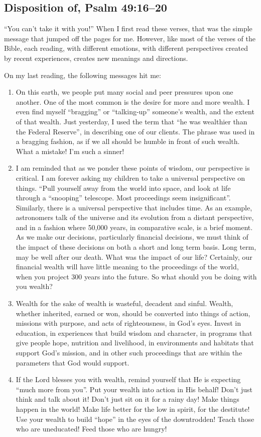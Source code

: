 \documentclass[12pt]{memoir}
\begin{document}
\subsection{Disposition of, Psalm 49:16--20}

``You can't take it with you!'' When I first read these verses,
that was the simple message that jumped off the pages for me. However,
like most of the verses of the Bible, each reading, with different
emotions, with different perspectives created by recent experiences,
creates new meanings and directions.

On my last reading, the following messages hit me: 
\begin{enumerate}
\item On this earth, we people put many social and peer pressures upon one
another. One of the most common is the desire for more and more wealth.
I even find myself ``bragging'' or ``talking-up'' someone's wealth,
and the extent of that wealth. Just yesterday, I used the term that
``he was wealthier than the Federal Reserve'', in describing one
of our clients. The phrase was used in a bragging fashion, as if we
all should be humble in front of such wealth. What a mistake! I'm
such a sinner! 
\item I am reminded that as we ponder these points of wisdom, our perspective
is critical. I am forever asking my children to take a universal perspective
on things. ``Pull yourself away from the world into space, and look
at life through a ``snooping'' telescope. Most proceedings seem
insignificant''. Similarly, there is a universal perspective that
includes time. As an example, astronomers talk of the universe and
its evolution from a distant perspective, and in a fashion where 50,000
years, in comparative scale, is a brief moment. As we make our decisions,
particularly financial decisions, we must think of the impact of these
decisions on both a short and long term basis. Long term, may be well
after our death. What was the impact of our life? Certainly, our financial
wealth will have little meaning to the proceedings of the world, when
you project 300 years into the future. So what should you be doing
with you wealth?

\item Wealth for the sake of wealth is wasteful, decadent and sinful. Wealth, whether inherited, earned or won, should be converted into things of action, missions with purpose, and acts of righteousness,
in God's eyes. Invest in education, in experiences that build wisdom
and character, in programs that give people hope, nutrition and livelihood,
in environments and habitats that support God's mission, and in other
such proceedings that are within the parameters that God would support. 
\item If the Lord blesses you with wealth, remind yourself that He is expecting
``much more from you''. Put your wealth into action in His behalf!
Don't just think and talk about it! Don't just sit on it for a rainy
day! Make things happen in the world! Make life better for the low
in spirit, for the destitute! Use your wealth to build ``hope''
in the eyes of the downtrodden! Teach those who are uneducated! Feed
those who are hungry! 
\end{enumerate}
\end{document}
